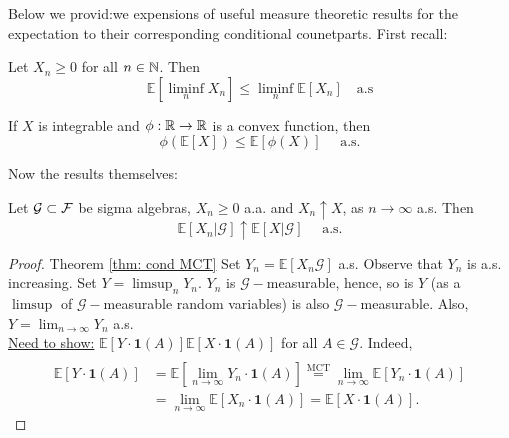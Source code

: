 \documentclass{article}
\begin{document}
Below we provid:we expensions of useful measure theoretic results for the expectation to their corresponding conditional counetparts. First recall:
\begin{boxlemma}\label{lemma: Fatou}
Let $  X_{n}\geq 0$ for all $ n\in \mathbb{N}$. Then 
\[
	\mathbb{E}[\displaystyle\liminf_{n}X_{n}]\leq \liminf_{n}\mathbb{E}[X_{n}] \quad \text{a.s}
\]


\end{boxlemma}


\begin{theorem}\label{thm: jensen}
If $ X$ is integrable and $ \phi: \mathbb{R} \to \mathbb{R}$ is a convex function, then 
\[
	\phi(\mathbb{E}[X])\leq\mathbb{E}[\phi(X)]\quad   \text{ a.s.}
\]
\end{theorem}
Now the results themselves:

\begin{theorem}\label{thm: cond MCT}
Let $\mathcal{G}\subset \mathcal{F}$ be sigma algebras, $ X_{n}\geq 0$ a.a. and $ X_{n}\uparrow X$, as $ n\to \infty$ a.s. Then 
\[
	\mathbb{E}[X_{n}|\mathcal{G}]\uparrow\mathbb{E}[X|\mathcal{G}] \quad \text{ a.s.}
\]

\end{theorem}

\begin{proof}{Theorem \ref{thm: cond MCT}}
	Set $ Y_{n} =\mathbb{E}[X_{n}\mathcal{G}]$ a.s. Observe that $ Y_{n}$ is a.s. increasing. Set $ Y = \displaystyle\limsup_{n}Y_{n}$. $ Y_{n}$ is $\mathcal{G}-$measurable, hence, so is $ Y$ (as a $ \displaystyle \limsup $ of $\mathcal{G}-$measurable random variables) is also $\mathcal{G}-$measurable. Also, $ Y = \displaystyle \lim_{n\to \infty}Y_{n} $ a.s.\\ 

	\underline{Need to show:} $\mathbb{E}[Y\cdot\mathbf{1}(A)]\mathbb{E}[X\cdot\mathbf{1}(A)]$ for all $ A\in\mathcal{G}$.	Indeed,
	\[\begin{array}{ll}
	    \\
	    \mathbb{E}[Y\cdot\mathbf{1}(A)] &=\mathbb{E}[ \displaystyle \lim_{n\to \infty }Y_{n}\cdot\mathbf{1}(A) ] \stackrel{\text{MCT}}{=} \displaystyle \lim_{n\to \infty} \mathbb{E}[Y_{n}\cdot\mathbf{1}(A)]\\
																	      &=\displaystyle \lim_{n\to \infty }\mathbb{E}[X_{n}\cdot\mathbf{1}(A)]  =\mathbb{E}[X\cdot\mathbf{1}(A)].
	\end{array}
	\]
	
\end{proof}
\end{document}
